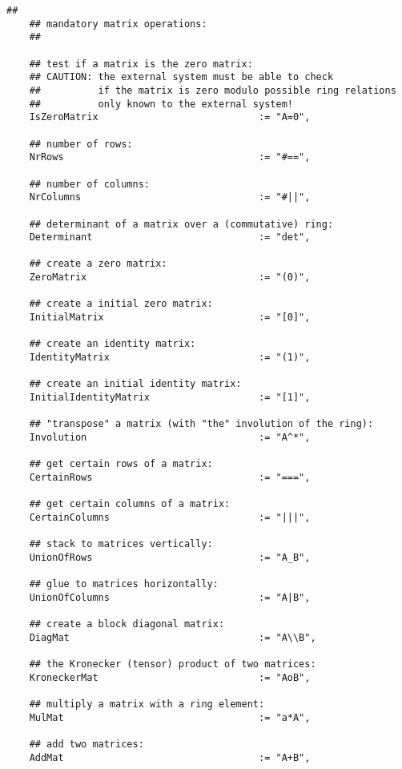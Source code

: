\documentclass[a4paper,11pt]{report}
\begin{document}
{{{\begin{Verbatim}[fontsize=\small,frame=single,label=Code]
    ##
    ## mandatory matrix operations:
    ##
    
    ## test if a matrix is the zero matrix:
    ## CAUTION: the external system must be able to check
    ##          if the matrix is zero modulo possible ring relations
    ##          only known to the external system!
    IsZeroMatrix                            := "A=0",
    
    ## number of rows:
    NrRows                                  := "#==",
    
    ## number of columns:
    NrColumns                               := "#||",
    
    ## determinant of a matrix over a (commutative) ring:
    Determinant                             := "det",
    
    ## create a zero matrix:
    ZeroMatrix                              := "(0)",
    
    ## create a initial zero matrix:
    InitialMatrix                           := "[0]",
    
    ## create an identity matrix:
    IdentityMatrix                          := "(1)",
    
    ## create an initial identity matrix:
    InitialIdentityMatrix                   := "[1]",
    
    ## "transpose" a matrix (with "the" involution of the ring):
    Involution                              := "A^*",
    
    ## get certain rows of a matrix:
    CertainRows                             := "===",
    
    ## get certain columns of a matrix:
    CertainColumns                          := "|||",
    
    ## stack to matrices vertically:
    UnionOfRows                             := "A_B",
    
    ## glue to matrices horizontally:
    UnionOfColumns                          := "A|B",
    
    ## create a block diagonal matrix:
    DiagMat                                 := "A\\B",
    
    ## the Kronecker (tensor) product of two matrices:
    KroneckerMat                            := "AoB",
    
    ## multiply a matrix with a ring element:
    MulMat                                  := "a*A",
    
    ## add two matrices:
    AddMat                                  := "A+B",
    

\end{Verbatim}}}}
\end{document}
